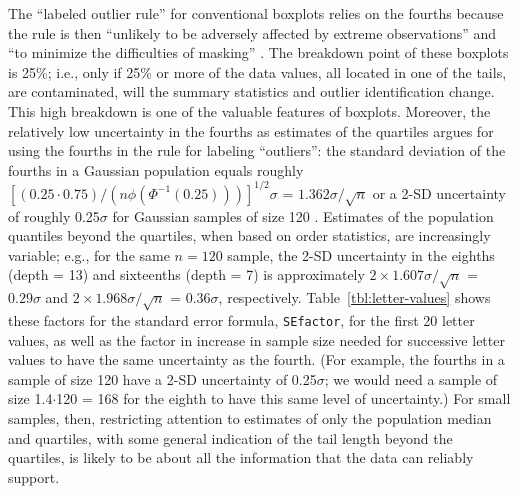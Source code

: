 \documentclass[12pt,oneside]{article}
\begin{document}
The ``labeled outlier rule'' for conventional boxplots relies on the fourths because the rule is then ``unlikely to be adversely affected by extreme observations'' and ``to minimize the difficulties of masking'' \citep[pg. 992]{dchbox}. The breakdown point of these boxplots is 25\%; i.e., only if 25\% or more of the data values, all located in one of the tails, are contaminated, will the summary statistics and outlier identification change. This high breakdown is one of the valuable features of boxplots. Moreover, the relatively low uncertainty in the fourths as estimates of the quartiles argues for using the fourths in the rule for labeling ``outliers'': the standard deviation of the fourths in a Gaussian population equals roughly $[(0.25 \cdot 0.75) / (n \phi(\Phi^{-1}(0.25)))]^{1/2} \sigma$ = $1.362 \sigma / \sqrt{n}$ or a 2-SD uncertainty of roughly 0.25$\sigma$ for Gaussian samples of size 120 \citep{ha.order}. Estimates of the population quantiles beyond the quartiles, when based on order statistics, are increasingly variable; e.g., for the same $n = 120$ sample, the 2-SD uncertainty in the eighths (depth = 13) and sixteenths (depth = 7) is approximately $ 2 \times 1.607 \sigma / \sqrt{n}$ = $0.29 \sigma$ and $ 2 \times 1.968 \sigma / \sqrt{n}$ = $0.36 \sigma$, respectively. Table~\ref{tbl:letter-values} shows these factors for the standard error formula, \texttt{SEfactor}, for the first 20 letter values, as well as the factor in increase in sample size needed for successive letter values to have the same uncertainty as the fourth. (For example, the fourths in a sample of size 120 have a 2-SD uncertainty of 0.25$\sigma$; we would need a sample of size 1.4$\cdot$120 = 168 for the eighth to have this same level of uncertainty.) For small samples, then, restricting attention to estimates of only the population median and quartiles, with some general indication of the tail length beyond the quartiles, is likely to be about all the information that the data can reliably support.
\end{document}
